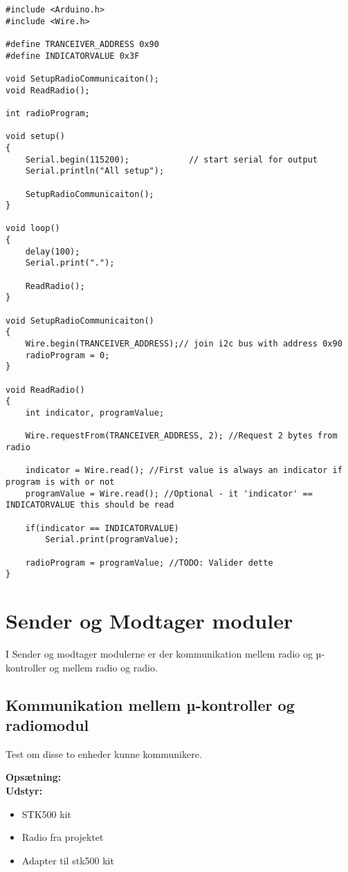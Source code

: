 \documentclass[Main]{subfiles}
\begin{document}
\begin{lstlisting}[caption=title, style=Code-C, label=lst:itocLEs]
#include <Arduino.h>
#include <Wire.h>

#define TRANCEIVER_ADDRESS 0x90
#define INDICATORVALUE 0x3F

void SetupRadioCommunicaiton();
void ReadRadio();

int radioProgram;

void setup()
{
	Serial.begin(115200);            // start serial for output
	Serial.println("All setup");

	SetupRadioCommunicaiton();
}

void loop()
{
	delay(100);
	Serial.print(".");
	
	ReadRadio();
}

void SetupRadioCommunicaiton()
{
	Wire.begin(TRANCEIVER_ADDRESS);// join i2c bus with address 0x90
	radioProgram = 0;
}

void ReadRadio()
{
	int indicator, programValue;

	Wire.requestFrom(TRANCEIVER_ADDRESS, 2); //Request 2 bytes from radio

	indicator = Wire.read(); //First value is always an indicator if program is with or not
	programValue = Wire.read(); //Optional - it 'indicator' == INDICATORVALUE this should be read

	if(indicator == INDICATORVALUE)
		Serial.print(programValue);

	radioProgram = programValue; //TODO: Valider dette
}
\end{lstlisting}

\section{Sender og Modtager moduler}
I Sender og modtager modulerne er der kommunikation mellem radio og µ-kontroller og mellem radio og radio.

\newpage
\subsection{Kommunikation mellem µ-kontroller og radiomodul}
Test om disse to enheder kunne kommunikere.


\textbf{Opsætning:}\\
\textbf{Udstyr:}
\begin{itemize}
\item STK500 kit
\item Radio fra projektet
\item Adapter til stk500 kit
\end{itemize}
\end{document}
